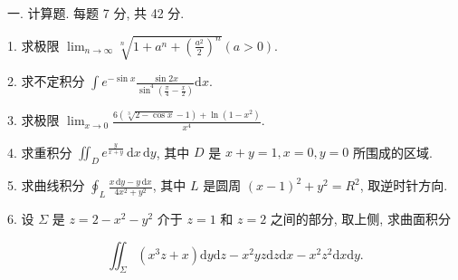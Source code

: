 \documentclass{examcollection}
\renewcommand{\displayformula}[1]{\[#1\]}
\begin{document}
{\begin{minipage}{\textwidth}
\smallskip
一. 计算题. 每题 7 分, 共 42 分.\par
1. 求极限 $\lim_{n\to \infty}\sqrt[n]{1 + a^n +\left(\frac{a^2}{2}\right)^n}$$(a > 0)$.\par
2. 求不定积分 $\int e^{-\sin x} \frac{\sin 2x}{\sin^4\left(\frac{\pi}{4} - \frac{x}{2}\right)} \mathrm{d}x.$\par
3. 求极限 $\lim_{x\to 0}\frac{6\left(\sqrt[3]{2 - \cos x} - 1\right) + \ln(1 - x^2)}{x^4}$.\par
4. 求重积分 $\iint_{D} e^{\frac{y}{x + y}} \, \mathrm{d}x \, \mathrm{d}y$, 其中 $D$ 是 $x + y = 1, x = 0, y = 0$ 所围成的区域.\par
5. 求曲线积分 $\oint_{L} \frac{x \, \mathrm{d}y - y \, \mathrm{d}x}{4x^{2} + y^{2}}$, 其中 $L$ 是圆周 $(x - 1)^{2} + y^{2} = R^{2}$, 取逆时针方向.\par
6. 设 $\Sigma$ 是 $z = 2 - x^2 - y^2$ 介于 $z = 1$ 和 $z = 2$ 之间的部分, 取上侧, 求曲面积分\par
\displayformula{\iint_ {\Sigma} \left(x ^ {3} z + x\right) \mathrm{d} y \mathrm{d} z - x ^ {2} y z \mathrm{d} z \mathrm{d} x - x ^ {2} z ^ {2} \mathrm{d} x \mathrm{d} y.}\par
\end{minipage}}
\ifdim\dimexpr\ht\proofbox+\dp\proofbox\relax>\textheight
\noindent\resizebox{!}{\textheight}{\usebox{\proofbox}}\else\noindent\usebox{\proofbox}\fi\clearpage
\end{document}
